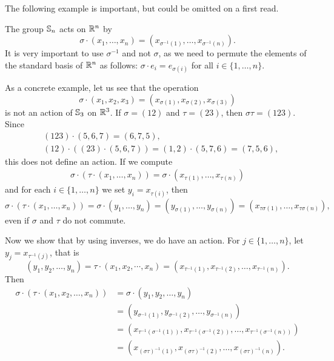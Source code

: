 The following example is important, but could be omitted on a first read.

\begin{optional}  
\begin{example}
    The group $\mathbb{S}_n$ acts on $\mathbb{R}^n$ by
    \[
    \sigma\cdot (x_1,\dots,x_n)=(x_{\sigma^{-1}(1)},\dots,x_{\sigma^{-1}(n)}).
    \]
    It is very important to use $\sigma^{-1}$ and not $\sigma$,
    as we need to permute the elements of the standard basis of $\mathbb{R}^n$
    as follows: $\sigma\cdot e_i=e_{\sigma(i)}$
    for all $i\in\{1,\dots,n\}$.
    
    As a concrete example, let us see that the operation 
    \[
    \sigma\cdot (x_1,x_2,x_3)=(x_{\sigma(1)},x_{\sigma(2)},x_{\sigma(3)})
    \]
    is not an action of $\mathbb{S}_3$ on $\mathbb{R}^3$.
    If $\sigma=(12)$ and $\tau=(23)$, then $\sigma\tau=(123)$. Since 
    \begin{align*}
    &(123)\cdot (5,6,7)=(6,7,5),\\
    &(12)\cdot ((23)\cdot (5,6,7))=(1,2)\cdot (5,7,6)=(7,5,6),
    \end{align*}
    this does not define an action. If we compute 
    \begin{align*}
        \sigma\cdot (\tau\cdot (x_1,\dots,x_n))
        =\sigma\cdot (x_{\tau(1)},\dots,x_{\tau(n)})
    \end{align*}
    and for each $i\in\{1,\dots,n\}$ we set $y_i=x_{\tau(i)}$, then 
    \[
    \sigma\cdot (\tau\cdot (x_1,\dots,x_n))=\sigma\cdot (y_1,\dots,y_n)=(y_{\sigma(1)},\dots,y_{\sigma(n)})
    =(x_{\tau\sigma(1)},\dots,x_{\tau\sigma(n)}),
    \]
    even if $\sigma$ and $\tau$ do not commute.

    Now we show that by using inverses, we do have an action. 
    For $j\in\{1,\dots,n\}$, let $y_j=x_{\tau^{-1}(j)}$,
    that is 
    \[
    (y_1,y_2,\dots,y_n)=\tau\cdot (x_1,x_2,\cdots,x_n)=(x_{\tau^{-1}(1)},x_{\tau^{-1}(2)},\dots,x_{\tau^{-1}(n)}).
    \]
    Then 
    \begin{align*}
        \sigma\cdot (\tau\cdot (x_1,x_2,\dots,x_n))&=\sigma\cdot (y_1,y_2,\dots,y_n)\\
        &=\left(y_{\sigma^{-1}(1)},y_{\sigma^{-1}(2)},\dots,y_{\sigma^{-1}(n)}\right)\\
        &=\left(x_{\tau^{-1}(\sigma^{-1}(1))},x_{\tau^{-1}(\sigma^{-1}(2))},\dots,x_{\tau^{-1}(\sigma
^{-1}(n))}\right)\\
        &=\left(x_{(\sigma\tau)^{-1}(1)},x_{(\sigma\tau)^{-1}(2)},\dots,x_{(\sigma\tau)^{-1}(n)}\right).
    \end{align*}
\end{example}
\end{optional}

